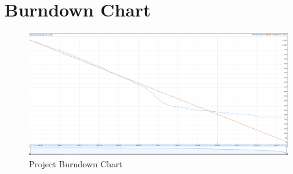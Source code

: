 \section{Burndown Chart}
\begin{figure}
\includegraphics{images/burndown_chart.png}
\caption{Project Burndown Chart}
\end{figure}